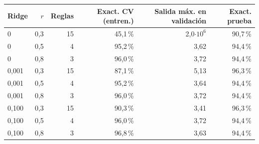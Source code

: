 \begin{tabular}{lrrrrr}
\toprule
Ridge & $r$ & Reglas & Exact. CV (entren.) & Salida máx. en validación & Exact. prueba \\
\midrule
0 & 0,3 & 15 & 45,1\,\% & 2,0$\cdot10^{6}$ & 90,7\,\% \\
0 & 0,5 & 4 & 95,2\,\% & 3,62 & 94,4\,\% \\
0 & 0,8 & 3 & 96,0\,\% & 3,72 & 94,4\,\% \\
0,001 & 0,3 & 15 & 87,1\,\% & 5,13 & 96,3\,\% \\
0,001 & 0,5 & 4 & 95,2\,\% & 3,64 & 94,4\,\% \\
0,001 & 0,8 & 3 & 96,0\,\% & 3,72 & 94,4\,\% \\
0,100 & 0,3 & 15 & 90,3\,\% & 3,41 & 96,3\,\% \\
0,100 & 0,5 & 4 & 96,0\,\% & 3,72 & 94,4\,\% \\
0,100 & 0,8 & 3 & 96,8\,\% & 3,63 & 94,4\,\% \\
\bottomrule
\end{tabular}

